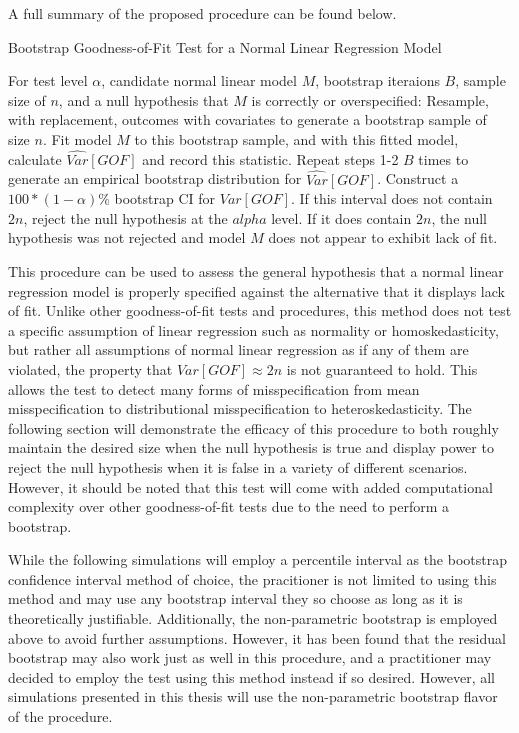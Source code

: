 		A full summary of the proposed procedure can be found below.
		\begin{algorithm}
			\caption{Bootstrap Goodness-of-Fit Test for a Normal Linear Regression Model}
			\begin{algorithmic}[1]
			  \Statex For test level $\alpha$, candidate normal linear model $M$, bootstrap iteraions $B$, sample size of $n$, and a null hypothesis that $M$
			  is correctly or overspecified:
			  \State Resample, with replacement, outcomes with covariates to generate a bootstrap sample of size $n$.
			  \State Fit model $M$ to this bootstrap sample, and with this fitted model, calculate $\widehat{Var}[GOF]$
			  and record this statistic.
			  \State Repeat steps 1-2 $B$ times to generate an empirical bootstrap distribution for $\widehat{Var}[GOF]$.
			  \State Construct a $100*(1-\alpha)$\% bootstrap CI for $Var[GOF]$.
			  \State If this interval does not contain $2n$, reject the null hypothesis at the $alpha$ level. If it does contain
			  $2n$, the null hypothesis was not rejected and model $M$ does not appear to exhibit lack of fit. 
			\end{algorithmic}
		\end{algorithm}

		This procedure can be used to assess the general hypothesis that a normal linear regression model is properly specified against the alternative that it displays lack of fit.
		Unlike other goodness-of-fit tests and procedures, this method does not test a specific assumption of linear regression such as normality or homoskedasticity, but rather
		all assumptions of normal linear regression as if any of them are violated, the property that $Var[GOF] \approx 2n$ is not guaranteed to hold. This allows the test to detect
		many forms of misspecification from mean misspecification to distributional misspecification to heteroskedasticity. The following section will demonstrate the efficacy of
		this procedure to both roughly maintain the desired size when the null hypothesis is true and display power to reject the null hypothesis when it is false in a variety of different
		scenarios. However, it should be noted that this test will come with added computational complexity over other goodness-of-fit tests due to the need to perform a bootstrap.
		
		While the following simulations will employ a percentile interval as the bootstrap confidence interval method of choice, the pracitioner is not limited to using this method
		and may use any bootstrap interval they so choose as long as it is theoretically justifiable. Additionally, the non-parametric bootstrap is employed above to avoid further
		assumptions. However, it has been found that the residual bootstrap may also work just as well in this procedure, and a practitioner may decided to employ the test
		using this method instead if so desired. However, all simulations presented in this thesis will use the non-parametric bootstrap flavor of the procedure.
		
